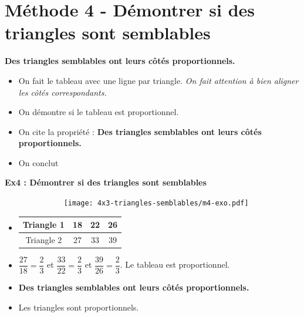 \section*{Méthode 4 - Démontrer si des triangles sont semblables}

\textbf{Des triangles semblables ont leurs côtés proportionnels.} 

\begin{itemize}
  \item On fait le tableau avec une ligne par triangle. \textit{On fait attention à bien aligner les côtés correspondants.}
  \item On démontre si le tableau est proportionnel.
  \item On cite la propriété : \textbf{Des triangles semblables ont leurs côtés proportionnels.} 
  \item On conclut
\end{itemize}

\horrule{1px}
\textbf{Ex4 : Démontrer si des triangles sont semblables}

\begin{multicols}{2}
  \begin{figure}[H]
        \centering
        \texttt{[image: 4x3-triangles-semblables/m4-exo.pdf]}
  \end{figure}
  \columnbreak

  \begin{itemize}
    \item     
    \begin{tabular}{|c|c|c|c|}
      \hline
      Triangle 1 & 18 & 22 & 26 \\  \hline
      Triangle 2 & 27 & 33 & 39\\  \hline
    \end{tabular}
    \item $\dfrac{27}{18} = \dfrac{2}{3}$ et $\dfrac{33}{22} = \dfrac{2}{3}$ et $\dfrac{39}{26} = \dfrac{2}{3}$. \newline
    Le tableau est proportionnel.
    \item \textbf{Des triangles semblables ont leurs côtés proportionnels.} 
    \item Les triangles sont proportionnels.
  \end{itemize}
  \end{multicols}


